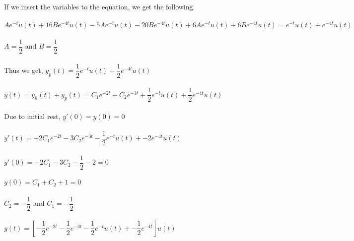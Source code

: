 \documentclass[10pt,a4paper, margin=1in]{article}
\begin{document}
\begin{enumerate}
\begin{enumerate}
    If we insert the variables to the equation, we get the following. \\\\
    $A e^{-t} u(t) + 16B e^{-4t} u(t) - 5A e^{-t} u(t) - 20B e^{-4t} u(t) + 6A e^{-t} u(t) + 6B e^{-4t} u(t) = e^{-t}u(t) + e^{-4t}u(t)$ \\ \\
    $A = \dfrac{1}{2}$ and $B=\dfrac{1}{2}$ \\ \\
    Thus we get, $y_p(t)= \dfrac{1}{2}e^{-t} u(t) + \dfrac{1}{2} e^{-4t} u(t)$ \\ \\
    $y(t)=y_h(t)+y_p(t) = C_1e^{-2t} + C_2e^{-3t} + \dfrac{1}{2}e^{-t} u(t) + \dfrac{1}{2} e^{-4t} u(t)$ \\ \\
    Due to initial rest, $y'(0)=y(0)=0$ \\ \\
    $y'(t)=-2 C_1e^{-2t} -3 C_2e^{-3t} - \dfrac{1}{2}e^{-t} u(t) + -2 e^{-4t} u(t)$ \\ \\
    $y'(0)=-2 C_1 -3 C_2 - \dfrac{1}{2}  -2 = 0$ \\ \\
    $y(0) = C_1 + C_2 + 1 = 0 $\\\\
    $C_2=-\dfrac{1}{2}$ and $C_1=-\dfrac{1}{2}$ \\ \\
    $y(t)=[-\dfrac{1}{2}e^{-2t} -\dfrac{1}{2}e^{-3t} - \dfrac{1}{2}e^{-t} u(t) + -\dfrac{1}{2} e^{-4t}]u(t)$ \\ \\
    \end{enumerate}


\end{enumerate}
\end{document}
